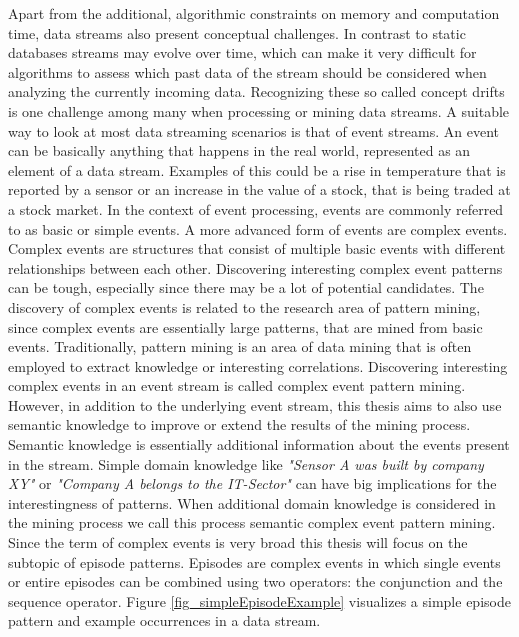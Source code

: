 Apart from the additional, algorithmic constraints on memory and computation time, data streams also present conceptual challenges. In contrast to static databases streams may evolve over time, which can make it very difficult for algorithms to assess which past data of the stream should be considered when analyzing the currently incoming data. Recognizing these so called concept drifts is one challenge among many when processing or mining data streams. \newline
A suitable way to look at most data streaming scenarios is that of event streams. An event can be basically anything that happens in the real world, represented as an element of a data stream. Examples of this could be a rise in temperature that is reported by a sensor or an increase in the value of a stock, that is being traded at a stock market. In the context of event processing, events are commonly referred to as basic or simple events. \newline
A more advanced form of events are complex events. Complex events are structures that consist of multiple basic events with different relationships between each other. Discovering interesting complex event patterns can be tough, especially since there may be a lot of potential candidates. The discovery of complex events is related to the research area of pattern mining, since complex events are essentially large patterns, that are mined from basic events. Traditionally, pattern mining is an area of data mining that is often employed to extract knowledge or interesting correlations. Discovering interesting complex events in an event stream is called complex event pattern mining. However, in addition to the underlying event stream, this thesis aims to also use semantic knowledge to improve or extend the results of the mining process. Semantic knowledge is essentially additional information about the events present in the stream. Simple domain knowledge like \textit{"Sensor A was built by company XY"} or \textit{"Company A belongs to the IT-Sector"} can have big implications for the interestingness of patterns. When additional domain knowledge is considered in the mining process we call this process semantic complex event pattern mining. \\
Since the term of complex events is very broad this thesis will focus on the subtopic of episode patterns. Episodes are complex events in which single events or entire episodes can be combined using two operators: the conjunction and the sequence operator. Figure \ref{fig_simpleEpisodeExample} visualizes a simple episode pattern and example occurrences in a data stream.

